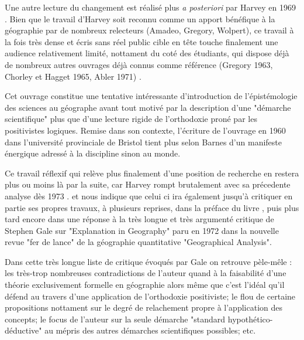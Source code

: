 {%

Une autre lecture du changement est réalisé plus \textit{a posteriori} par Harvey en 1969 \autocite{Harvey1969}. Bien que le travail d'Harvey soit reconnu comme un apport bénéfique à la géographie par de nombreux relecteurs (Amadeo, Gregory, Wolpert), ce travail à la fois très dense et écris sans réel public cible en tête touche finalement une audience relativement limité, nottament du coté des étudiants, qui dispose déjà de nombreux autres ouvrages déjà connus comme référence (Gregory 1963, Chorley et Hagget 1965, Abler 1971) \autocite{Johnston2008}.

Cet ouvrage constitue une tentative intéressante d'introduction de l'épistémologie des sciences au géographe avant tout motivé par la description d'une "démarche scientifique" plus que d'une lecture rigide de l'orthodoxie proné par les positivistes logiques. Remise dans son contexte, l'écriture de l'ouvrage en 1960 dans l'université provinciale de Bristol tient plus selon Barnes \autocite{Barnes} d'un manifeste énergique adressé à la discipline sinon au monde.

Ce travail réflexif qui relève plus finalement d'une position de recherche en restera plus ou moins là par la suite, car Harvey rompt brutalement avec sa précedente analyse dès 1973 \autocite[166-168]{Gould2004}. \autocite[30]{Johnston2008} et \autocite[37]{Barnes2005} nous indique que celui ci ira également jusqu'à critiquer en partie ses propres travaux, à plusieurs reprises, dans la préface du livre \autocite{Harvey1969}, puis plus tard encore \autocite{Harvey1972} dans une réponse à la très longue et très argumenté critique de Stephen Gale sur "Explanation in Geography" \autocite{Gale1972} paru en 1972 dans la nouvelle revue "fer de lance" de la géographie quantitative "Geographical Analysis". 

Dans cette très longue liste de critique évoqués par Gale on retrouve pèle-mêle : les très-trop nombreuses contradictions de l'auteur quand à la faisabilité d'une théorie exclusivement formelle en géographie alors même que c'est l'idéal qu'il défend au travers d'une application de l'orthodoxie positiviste; le flou de certaine propositions nottament sur le degré de relachement propre à l'application des concepts; le focus de l'auteur sur la seule démarche "standard hypothético-déductive" au mépris des autres démarches scientifiques possibles; etc. 

}

